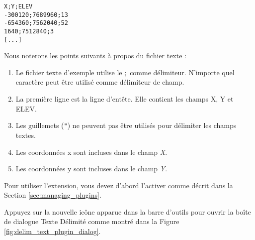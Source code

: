 \begin{verbatim} 
X;Y;ELEV
-300120;7689960;13
-654360;7562040;52
1640;7512840;3
[...]
\end{verbatim}

Nous noterons les points suivants à propos du fichier texte :

\begin{enumerate}
\item Le fichier texte d'exemple utilise le \mbox{$;$} comme délimiteur. 
N'importe quel caractère peut être utilisé comme délimiteur de champ.
\item La première ligne est la ligne d'entête. Elle contient les champs X, Y 
et ELEV.
\item Les guillemets ({\tt{}"{}}) ne peuvent pas être utilisés pour délimiter 
les champs textes.
\item Les coordonnées x sont incluses dans le champ {\em X}.
\item Les coordonnées y sont incluses dans le champ {\em Y}.
\end{enumerate}

Pour utiliser l'extension, vous devez d'abord l'activer comme décrit dans la 
Section \ref{sec:managing_plugins}.

Appuyez sur la nouvelle icône apparue dans la barre d'outils  
pour ouvrir la boîte de dialogue Texte Délimité comme montré dans la Figure \ref{fig:delim_text_plugin_dialog}.

